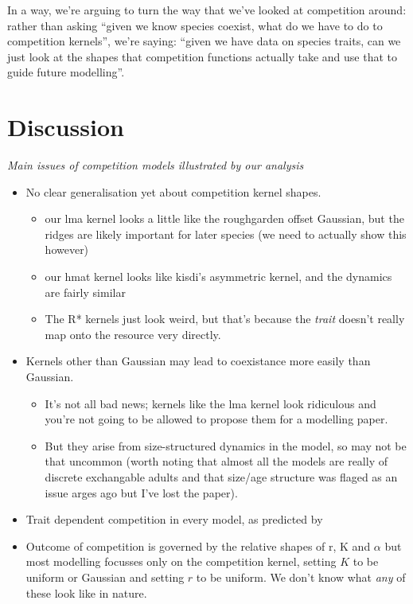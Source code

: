\documentclass[a4paper,11pt]{article}
\begin{document}
In a way, we're arguing to turn the way that we've looked at
competition around: rather than asking ``given we know species
coexist, what do we have to do to competition kernels'', we're
saying: ``given we have data on species traits, can we just look at
the shapes that competition functions actually take and use that to
guide future modelling''.

\clearpage
\section{Discussion}

\textit{Main issues of competition models illustrated by our analysis}
\begin{itemize}
\item No clear generalisation yet about competition kernel shapes.
  \begin{itemize}
  \item our lma kernel looks a little like the roughgarden offset
    Gaussian, but the ridges are likely important for later species
    (we need to actually show this however)
  \item  our hmat kernel looks like kisdi's asymmetric kernel, and the
    dynamics are fairly similar
  \item The R* kernels just look weird, but that's because the
    \emph{trait} doesn't really map onto the resource very directly.
  \end{itemize}
\item Kernels other than Gaussian may lead to coexistance more easily
  than Gaussian.  
  \begin{itemize}
  \item It's not all bad news; kernels like the lma kernel
    look ridiculous and you're not going to be allowed to propose them
    for a modelling paper.
  \item But they arise from size-structured dynamics
    in the model, so may not be that uncommon (worth noting that almost
    all the models are really of discrete exchangable adults and that
    size/age structure was flaged as an issue arges ago but I've lost
    the paper).
  \end{itemize}
\item Trait dependent competition in every model, as predicted by
  \citet{Abrams-1980}
\item Outcome of competition is governed by the relative shapes of r,
  K and $\alpha$ but most modelling focusses only on the competition
  kernel, setting $K$ to be uniform or Gaussian and setting $r$ to be
  uniform.  We don't know what \emph{any} of these look like in nature.
\end{itemize}
\end{document}
